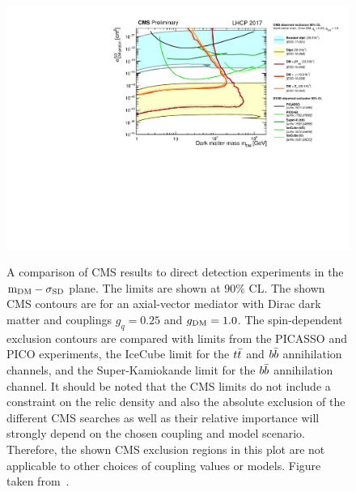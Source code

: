 \begin{figure}[p]
  \centering
  \includegraphics[width=\textwidth]{SD_CMSDD_Summary.pdf}\\
  \caption{A comparison of \protect \acs{CMS} results to direct detection experiments in the $\protect\mathrm{m_{DM}}-\sigma_{\mathrm{SD}}$ plane. The limits are shown at $90\%$ CL. The shown \protect \acs{CMS} contours are for an axial-vector mediator with Dirac dark matter and couplings $g_q=0.25$ and $\protect g_{\mathrm{DM}} = 1.0$. The spin-dependent exclusion contours are compared with limits from the PICASSO and PICO experiments, the IceCube limit for the $\protect t\bar{t}$ and $\protect b\bar{b}$ annihilation channels, and the Super-Kamiokande limit for the $\protect b\bar{b}$ annihilation channel.  It should be noted that the \protect \acs{CMS} limits do not include a constraint on the relic density and also the absolute exclusion of the different \protect \acs{CMS} searches as well as their relative importance will strongly depend on the chosen coupling and model scenario.  Therefore, the shown \protect  \acs{CMS} exclusion regions in this plot are not applicable to other choices of coupling values or models. Figure taken from~\cite{DMsummary}.}
  \label{fig:summary_SD}
\end{figure}

